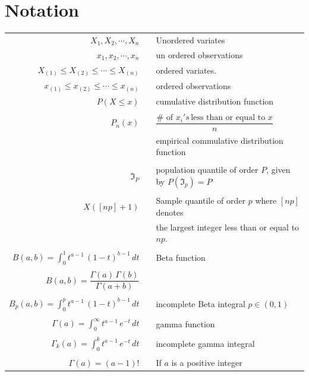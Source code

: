 \documentclass[12pt,a4paper]{report}
\theoremstyle{definition}
\theoremstyle{plain}
\begin{document}
\section{Notation}
\begin{tabular}{rcl}
$X_1, X_2, \cdots , X_n$  && Unordered variates\\
$x_1, x_2, \cdots, x_n$ && un ordered observations\\
$X_{(1)} \leq X_{(2)} \leq \cdots \leq X_{(n)}$ && ordered variates.\\
$x_{(1)}\leq x_{(2)}\leq \cdots \leq x_{(n)}$ && ordered observations\\
$P(X\leq x)$ && cumulative distribution function\\\\
$P_n(x)  $ && $\dfrac{\# \,\,\text{of}\,\, x_i's\, \text{less than or equal to}\, \, x}{n}$\\
            && empirical commulative distribution function\\\\
 $\Im_P$ && population quantile of order $P$, given by $P(\Im_p) = P$\\\\
$X([np]+1) $ && Sample quantile of order $p$ where $[np]$ denotes\\
               &&  the largest integer less than or equal to $np$.\\\\
$B(a,b) = \displaystyle{\int^1_0 t^{a - 1}\, (1 - t)^{b - 1}\, dt}$ && Beta function\\\\
$B(a,b) = \dfrac{\Gamma(a)\, \Gamma(b)}{\Gamma(a + b)}$ && \\\\
$\displaystyle{B_p(a,b) = \int^p_{0}t^{a - 1}\, (1 - t)^{b - 1}\, dt}$ && incomplete Beta integral $p\in (0,1)$\\\\
$\Gamma(a) = \displaystyle{\int^{\infty}_0t^{a - 1}\, e^{-t}\, dt}$ && gamma function\\\\
$\Gamma_{k}(a) = \displaystyle{\int_0^{k}t^{a - 1}\, e^{-t}\, dt}$ && incomplete gamma integral\\\\
$\Gamma(a) = (a - 1)!$ && If $a$ is a positive integer\\
\end{tabular}



\newpage
\end{document}
